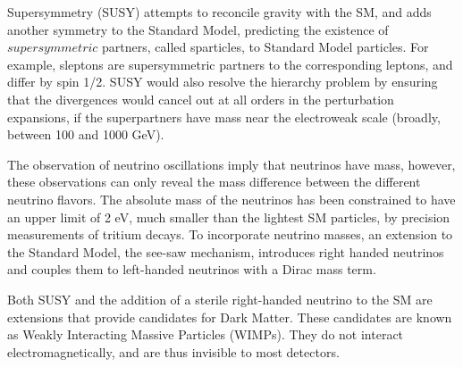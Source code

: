 \documentclass[11pt,a4paper,openright,twoside]{report}
\begin{document}
Supersymmetry (SUSY) attempts to reconcile gravity with the SM, and adds another symmetry to the Standard Model, predicting the existence of $supersymmetric$ partners, called sparticles, to Standard Model particles. For example, sleptons are supersymmetric partners to the corresponding leptons, and differ by spin 1/2. SUSY would also resolve the hierarchy problem by ensuring that the divergences would cancel out at all orders in the perturbation expansions, if the superpartners have mass near the electroweak scale (broadly, between 100 and 1000 GeV).

The observation of neutrino oscillations imply that neutrinos have mass, however, these observations can only reveal the mass difference between the different neutrino flavors. The absolute mass of the neutrinos has been constrained to have an upper limit of 2 eV, much smaller than the lightest SM particles, by precision measurements of tritium decays. To incorporate neutrino masses, an extension to the Standard Model, the see-saw mechanism, introduces right handed neutrinos and couples them to left-handed neutrinos with a Dirac mass term.

Both SUSY and the addition of a sterile right-handed neutrino to the SM are extensions that provide candidates for Dark Matter. These candidates are known as Weakly Interacting Massive Particles (WIMPs). They do not interact electromagnetically, and are thus invisible to most detectors.
\end{document}
